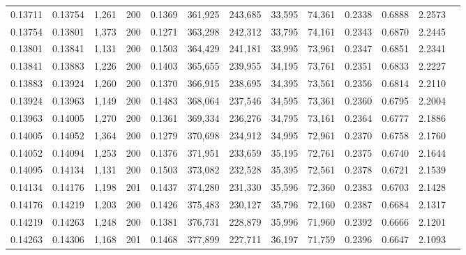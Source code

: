 \begin{tabular}{rrrrrrrrrrrrr}
0.13711 & 0.13754 & 1,261 & 200 &                                     0.1369 & 361,925 & 243,685 &  33,595 &  74,361 & 0.2338 & 0.6888 & 2.2573 \\
0.13754 & 0.13801 & 1,373 & 200 &                                     0.1271 & 363,298 & 242,312 &  33,795 &  74,161 & 0.2343 & 0.6870 & 2.2445 \\
0.13801 & 0.13841 & 1,131 & 200 &                                     0.1503 & 364,429 & 241,181 &  33,995 &  73,961 & 0.2347 & 0.6851 & 2.2341 \\
0.13841 & 0.13883 & 1,226 & 200 &                                     0.1403 & 365,655 & 239,955 &  34,195 &  73,761 & 0.2351 & 0.6833 & 2.2227 \\
0.13883 & 0.13924 & 1,260 & 200 &                                     0.1370 & 366,915 & 238,695 &  34,395 &  73,561 & 0.2356 & 0.6814 & 2.2110 \\
0.13924 & 0.13963 & 1,149 & 200 &                                     0.1483 & 368,064 & 237,546 &  34,595 &  73,361 & 0.2360 & 0.6795 & 2.2004 \\
0.13963 & 0.14005 & 1,270 & 200 &                                     0.1361 & 369,334 & 236,276 &  34,795 &  73,161 & 0.2364 & 0.6777 & 2.1886 \\
0.14005 & 0.14052 & 1,364 & 200 &                                     0.1279 & 370,698 & 234,912 &  34,995 &  72,961 & 0.2370 & 0.6758 & 2.1760 \\
0.14052 & 0.14094 & 1,253 & 200 &                                     0.1376 & 371,951 & 233,659 &  35,195 &  72,761 & 0.2375 & 0.6740 & 2.1644 \\
0.14095 & 0.14134 & 1,131 & 200 &                                     0.1503 & 373,082 & 232,528 &  35,395 &  72,561 & 0.2378 & 0.6721 & 2.1539 \\
0.14134 & 0.14176 & 1,198 & 201 &                                     0.1437 & 374,280 & 231,330 &  35,596 &  72,360 & 0.2383 & 0.6703 & 2.1428 \\
0.14176 & 0.14219 & 1,203 & 200 &                                     0.1426 & 375,483 & 230,127 &  35,796 &  72,160 & 0.2387 & 0.6684 & 2.1317 \\
0.14219 & 0.14263 & 1,248 & 200 &                                     0.1381 & 376,731 & 228,879 &  35,996 &  71,960 & 0.2392 & 0.6666 & 2.1201 \\
0.14263 & 0.14306 & 1,168 & 201 &                                     0.1468 & 377,899 & 227,711 &  36,197 &  71,759 & 0.2396 & 0.6647 & 2.1093 \\

\end{tabular}
